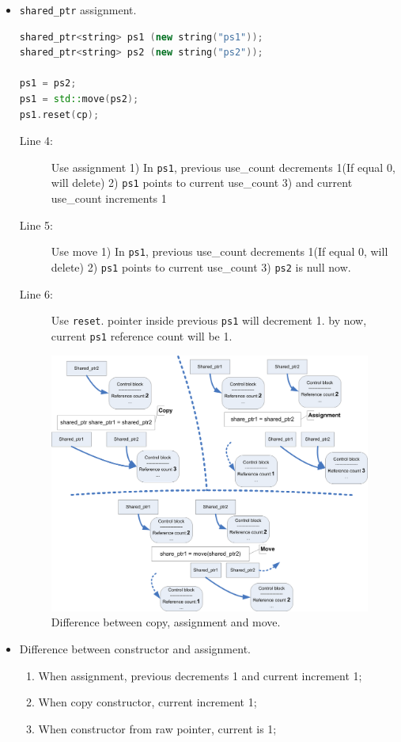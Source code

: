 \documentclass[a4paper,11pt,twoside]{book}
\begin{document}
\begin{itemize}
    \item \texttt{shared\_ptr} assignment.
\begin{lstlisting}[frame=single, language=c++, mathescape=true]
shared_ptr<string> ps1 (new string("ps1"));
shared_ptr<string> ps2 (new string("ps2"));

ps1 = ps2;
ps1 = std::move(ps2);
ps1.reset(cp); 
\end{lstlisting}
\begin{description}
	\item[Line 4:] Use assignment  1) In \texttt{ps1}, previous use\_count decrements 1(If equal 0, will delete) 2) \texttt{ps1} points to current use\_count 3) and current use\_count increments 1
	
	\item[Line 5:] Use move 1) In \texttt{ps1}, previous use\_count decrements 1(If equal 0, will delete) 2) \texttt{ps1} points to current use\_count 3) \texttt{ps2} is null now. 
	
	\item[Line 6:] Use \texttt{reset}. pointer inside previous \texttt{ps1} will decrement 1. by now, current \texttt{ps1} reference count will be 1.
\end{description}

\begin{figure}[h]
	\centering
	\includegraphics[width=0.9\linewidth]{pics/shared_ptr.png}
	\caption{Difference between copy, assignment and move.}
	\label{fig:sharedptr}
\end{figure}


\item Difference between constructor and assignment.
\begin{enumerate}
\item When assignment, previous decrements 1 and current increment 1;
\item When copy constructor, current increment 1;
\item When constructor from raw pointer, current is 1;
\end{enumerate}


\end{itemize}
\end{document}
